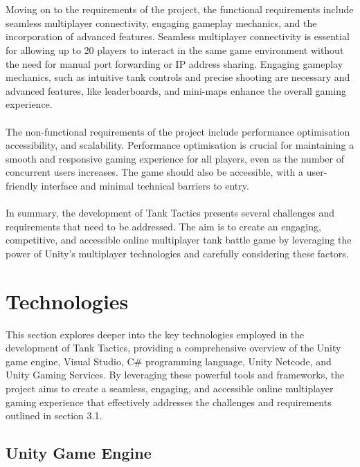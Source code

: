 \\
\noindent
\\
Moving on to the requirements of the project, the functional requirements include seamless multiplayer connectivity, engaging gameplay mechanics, and the incorporation of advanced features. Seamless multiplayer connectivity is essential for allowing up to 20 players to interact in the same game environment without the need for manual port forwarding or IP address sharing. Engaging gameplay mechanics, such as intuitive tank controls and precise shooting are necessary and advanced features, like leaderboards, and mini-maps enhance the overall gaming experience.
\\
\noindent
\\
The non-functional requirements of the project include performance optimisation accessibility, and scalability. Performance optimisation is crucial for maintaining a smooth and responsive gaming experience for all players, even as the number of concurrent users increases. The game should also be accessible, with a user-friendly interface and minimal technical barriers to entry.
\\
\noindent
\\
In summary, the development of Tank Tactics presents several challenges and requirements that need to be addressed. The aim is to create an engaging, competitive, and accessible online multiplayer tank battle game by leveraging the power of Unity's multiplayer technologies and carefully considering these factors. 

\section{Technologies}
This section explores deeper into the key technologies employed in the development of Tank Tactics, providing a comprehensive overview of the Unity game engine, Visual Studio, C\# programming language, Unity Netcode, and Unity Gaming Services. By leveraging these powerful tools and frameworks, the project aims to create a seamless, engaging, and accessible online multiplayer gaming experience that effectively addresses the challenges and requirements outlined in section 3.1.

\subsection{Unity Game Engine}

